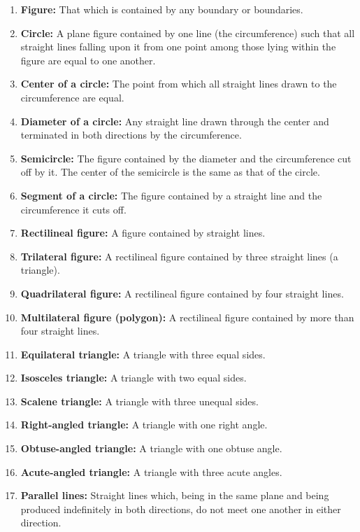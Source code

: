\documentclass{report}
\begin{document}
\begin{itemize}
\begin{enumerate}
                \item \textbf{Figure:} That which is contained by any boundary or boundaries.
                \item \textbf{Circle:} A plane figure contained by one line (the circumference) such that all straight lines falling upon it from one point among those lying within the figure are equal to one another.
                \item \textbf{Center of a circle:} The point from which all straight lines drawn to the circumference are equal.
                \item \textbf{Diameter of a circle:} Any straight line drawn through the center and terminated in both directions by the circumference.
                \item \textbf{Semicircle:} The figure contained by the diameter and the circumference cut off by it. The center of the semicircle is the same as that of the circle.
                \item \textbf{Segment of a circle:} The figure contained by a straight line and the circumference it cuts off.
                \item \textbf{Rectilineal figure:} A figure contained by straight lines.
                \item \textbf{Trilateral figure:} A rectilineal figure contained by three straight lines (a triangle).
                \item \textbf{Quadrilateral figure:} A rectilineal figure contained by four straight lines.
                \item \textbf{Multilateral figure (polygon):} A rectilineal figure contained by more than four straight lines.
                \item \textbf{Equilateral triangle:} A triangle with three equal sides.
                \item \textbf{Isosceles triangle:} A triangle with two equal sides.
                \item \textbf{Scalene triangle:} A triangle with three unequal sides.
                \item \textbf{Right-angled triangle:} A triangle with one right angle.
                \item \textbf{Obtuse-angled triangle:} A triangle with one obtuse angle.
                \item \textbf{Acute-angled triangle:} A triangle with three acute angles.
                \item \textbf{Parallel lines:} Straight lines which, being in the same plane and being produced indefinitely in both directions, do not meet one another in either direction.

\end{enumerate}
\end{itemize}
\end{document}
